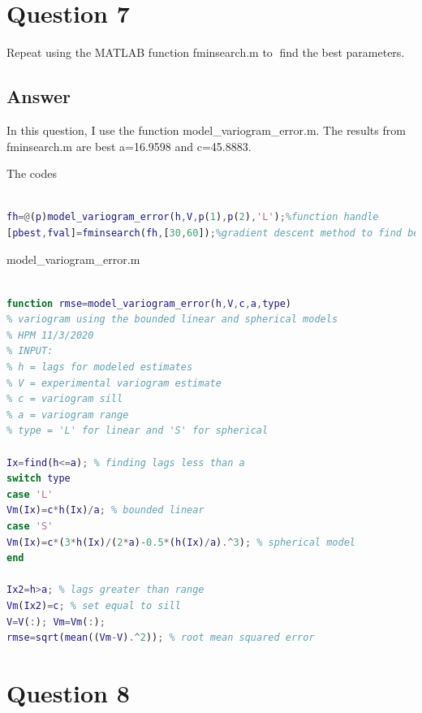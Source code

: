\documentclass[
	12pt, %
]{fphw}
\begin{document}



\section*{Question 7}

\begin{problem}
Repeat using the MATLAB function fminsearch.m to find the best parameters.	
\end{problem}


\subsection*{Answer}
In this question, I use the function model\_variogram\_error.m.
The results from fminsearch.m are best a=16.9598 and c=45.8883.


The codes
\begin{lstlisting}[language=Matlab,escapeinside=``]

fh=@(p)model_variogram_error(h,V,p(1),p(2),'L');%function handle
[pbest,fval]=fminsearch(fh,[30,60]);%gradient descent method to find best parameters

\end{lstlisting}
model\_variogram\_error.m

\begin{lstlisting}[language=Matlab,escapeinside=``]

function rmse=model_variogram_error(h,V,c,a,type)
% variogram using the bounded linear and spherical models
% HPM 11/3/2020
% INPUT:
% h = lags for modeled estimates
% V = experimental variogram estimate
% c = variogram sill
% a = variogram range
% type = 'L' for linear and 'S' for spherical

Ix=find(h<=a); % finding lags less than a
switch type
case 'L'
Vm(Ix)=c*h(Ix)/a; % bounded linear
case 'S'
Vm(Ix)=c*(3*h(Ix)/(2*a)-0.5*(h(Ix)/a).^3); % spherical model
end

Ix2=h>a; % lags greater than range
Vm(Ix2)=c; % set equal to sill
V=V(:); Vm=Vm(:);
rmse=sqrt(mean((Vm-V).^2)); % root mean squared error

\end{lstlisting}

\section*{Question 8 }
\end{document}
